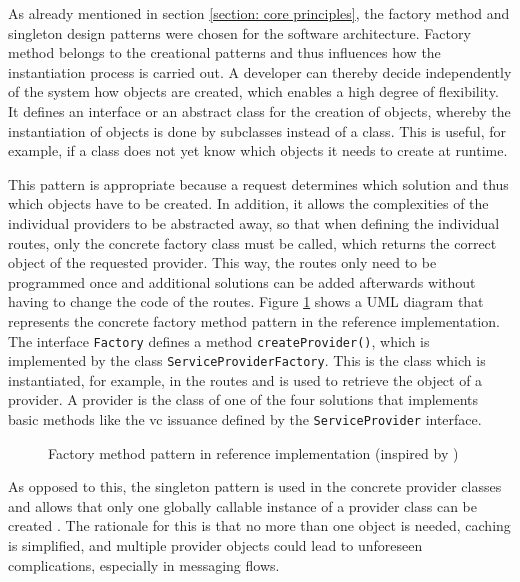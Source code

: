     As already mentioned in section \ref{section: core principles}, the factory method and singleton design patterns were chosen for the software architecture. Factory method belongs to the creational patterns and thus influences how the instantiation process is carried out. A developer can thereby decide independently of the system how objects are created, which enables a high degree of flexibility. It defines an interface or an abstract class for the creation of objects, whereby the instantiation of objects is done by subclasses instead of a class. This is useful, for example, if a class does not yet know which objects it needs to create at runtime. \cite[pp. 81, 85, 107-108]{gamma_design_1995} 
    
    This pattern is appropriate because a request determines which solution and thus which objects have to be created. In addition, it allows the complexities of the individual providers to be abstracted away, so that when defining the individual routes, only the concrete factory class must be called, which returns the correct object of the requested provider. This way, the routes only need to be programmed once and additional solutions can be added afterwards without having to change the code of the routes. Figure \ref{figure: factory method} shows a UML diagram that represents the concrete factory method pattern in the reference implementation. The interface \texttt{Factory} defines a method \texttt{createProvider()}, which is implemented by the class \texttt{ServiceProviderFactory}. This is the class which is instantiated, for example, in the routes and is used to retrieve the object of a provider. A provider is the class of one of the four solutions that implements basic methods like the \ac{vc} issuance defined by the \texttt{ServiceProvider} interface.
    
    \begin{figure}[ht]
	    \centering    	    \makebox[\textwidth]{}
        \caption[Factory method pattern in reference implementation]{Factory method pattern in reference implementation (inspired by \cite[p. 107]{gamma_design_1995})}
        \label{figure: factory method}
    \end{figure}
    
    As opposed to this, the singleton pattern is used in the concrete provider classes and allows that only one globally callable instance of a provider class can be created \cite[p. 127]{gamma_design_1995}. The rationale for this is that no more than one object is needed, caching is simplified, and multiple provider objects could lead to unforeseen complications, especially in messaging flows. 
    
